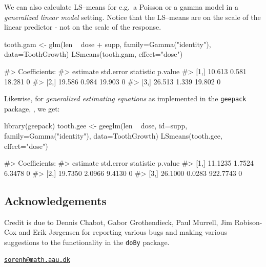 We can also calculate LS--means for e.g.~a Poisson or a gamma model in a
\emph{generalized linear model} setting. Notice that the LS--means are
on the scale of the linear predictor - not on the scale of the response.

\begin{Schunk}
\begin{Sinput}
tooth.gam <- glm(len ~ dose + supp, family=Gamma("identity"), data=ToothGrowth)
LSmeans(tooth.gam, effect="dose")
\end{Sinput}
\begin{Soutput}
#> Coefficients:
#>      estimate std.error statistic p.value
#> [1,]   10.613     0.581    18.281       0
#> [2,]   19.586     0.984    19.903       0
#> [3,]   26.513     1.339    19.802       0
\end{Soutput}
\end{Schunk}

Likewise, for \emph{generalized estimating equations} as implemented in
the \texttt{geepack} package, \citep{geepack}, we get:

\begin{Schunk}
\begin{Sinput}
library(geepack)
tooth.gee <- geeglm(len ~ dose, id=supp, family=Gamma("identity"), data=ToothGrowth)
LSmeans(tooth.gee, effect="dose")
\end{Sinput}
\begin{Soutput}
#> Coefficients:
#>      estimate std.error statistic p.value
#> [1,]  11.1235    1.7524    6.3478       0
#> [2,]  19.7350    2.0966    9.4130       0
#> [3,]  26.1000    0.0283  922.7743       0
\end{Soutput}
\end{Schunk}

\hypertarget{section}{%
\subsubsection{}\label{section}}

\hypertarget{acknowledgements}{%
\subsection{Acknowledgements}\label{acknowledgements}}

Credit is due to Dennis Chabot, Gabor Grothendieck, Paul Murrell, Jim
Robison-Cox and Erik Jørgensen for reporting various bugs and making
various suggestions to the functionality in the \texttt{doBy} package.




\address{%
Søren Højsgaard\\
Department of Mathematical Sciences, Aalborg University, Denmark\\
Skjernvej 4A\\ 9220 Aalborg Ø, Denmark\\
}
\href{mailto:sorenh@math.aau.dk}{\nolinkurl{sorenh@math.aau.dk}}

